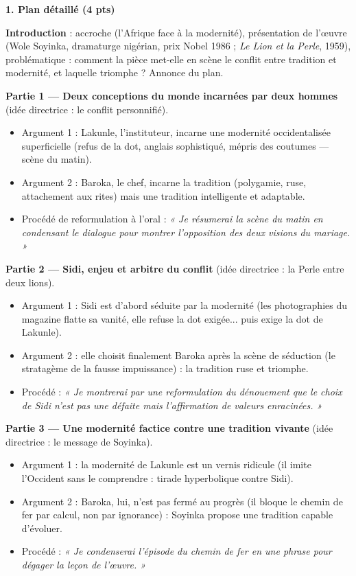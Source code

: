 \documentclass[11pt]{article}
\begin{document}
\begin{corrige}
\textbf{1. Plan détaillé (4 pts)}

\textbf{Introduction} : accroche (l'Afrique face à la modernité), présentation de l'œuvre (Wole Soyinka, dramaturge nigérian, prix Nobel 1986 ; \emph{Le Lion et la Perle}, 1959), problématique : comment la pièce met-elle en scène le conflit entre tradition et modernité, et laquelle triomphe ? Annonce du plan.

\textbf{Partie 1 — Deux conceptions du monde incarnées par deux hommes} (idée directrice : le conflit personnifié).
\begin{itemize}
    \item Argument 1 : Lakunle, l'instituteur, incarne une modernité occidentalisée superficielle (refus de la dot, anglais sophistiqué, mépris des coutumes — scène du matin).
    \item Argument 2 : Baroka, le chef, incarne la tradition (polygamie, ruse, attachement aux rites) mais une tradition intelligente et adaptable.
    \item Procédé de reformulation à l'oral : \emph{« Je résumerai la scène du matin en condensant le dialogue pour montrer l'opposition des deux visions du mariage. »}
\end{itemize}

\textbf{Partie 2 — Sidi, enjeu et arbitre du conflit} (idée directrice : la Perle entre deux lions).
\begin{itemize}
    \item Argument 1 : Sidi est d'abord séduite par la modernité (les photographies du magazine flatte sa vanité, elle refuse la dot exigée... puis exige la dot de Lakunle).
    \item Argument 2 : elle choisit finalement Baroka après la scène de séduction (le stratagème de la fausse impuissance) : la tradition ruse et triomphe.
    \item Procédé : \emph{« Je montrerai par une reformulation du dénouement que le choix de Sidi n'est pas une défaite mais l'affirmation de valeurs enracinées. »}
\end{itemize}

\textbf{Partie 3 — Une modernité factice contre une tradition vivante} (idée directrice : le message de Soyinka).
\begin{itemize}
    \item Argument 1 : la modernité de Lakunle est un vernis ridicule (il imite l'Occident sans le comprendre : tirade hyperbolique contre Sidi).
    \item Argument 2 : Baroka, lui, n'est pas fermé au progrès (il bloque le chemin de fer par calcul, non par ignorance) : Soyinka propose une tradition capable d'évoluer.
    \item Procédé : \emph{« Je condenserai l'épisode du chemin de fer en une phrase pour dégager la leçon de l'œuvre. »}
\end{itemize}


\end{corrige}
\end{document}
